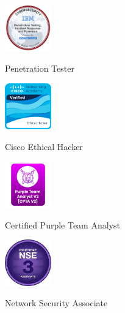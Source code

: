 \begin{figure}[htbp]
    \centering
    \begin{minipage}[t]{0.45\textwidth}
        \centering
        \href{https://www.credly.com/badges/1367a47a-2cf3-408d-a7be-26adaaf1066d}{
        \includegraphics[height=2cm]{badge/PENT.png}}
        \caption*{Penetration Tester}
    \end{minipage}
    \hfill
    \begin{minipage}[t]{0.45\textwidth}
        \centering
        \href{https://www.credly.com/badges/bc5666c7-c769-46c7-9ebd-d31458ad103d/linked_in_profile}{
        \includegraphics[height=2cm]{badge/ceh cisco.png}}
        \caption*{Cisco Ethical Hacker}
    \end{minipage}
\end{figure}

\begin{figure}[htbp]
    \centering
    \begin{minipage}[t]{0.45\textwidth}
        \centering
        \href{https://app.kajabi.com/certificates/0cb8dd89}{
        \includegraphics[height=2cm]{badge/CPTA-v2.png}}
        \caption*{Certified Purple Team Analyst}
    \end{minipage}
    \hfill
    \begin{minipage}[t]{0.45\textwidth}
        \centering
        \href{https://drive.google.com/file/d/16sqn1fYpKX8QDNoTrmbRuvluLTrWHJgE/view?usp=sharing}{
        \includegraphics[height=2cm]{badge/nse.png}}
        \caption*{Network Security Associate}
    \end{minipage}
\end{figure}






